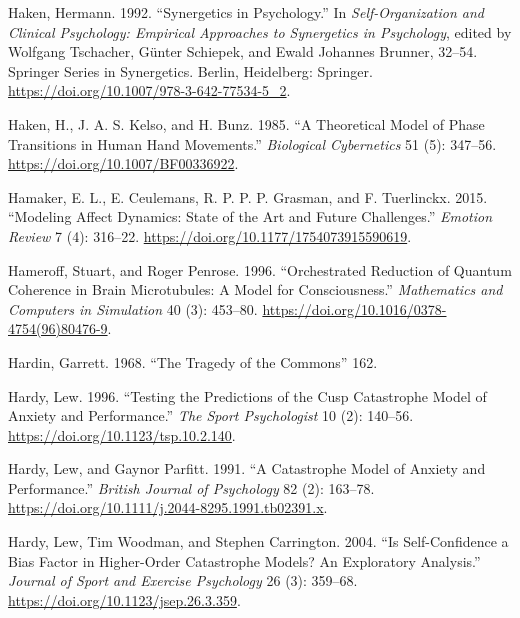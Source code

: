 \documentclass[
  a4paper,
  DIV=11,
  numbers=noendperiod]{scrreprt}
\newlength{\cslhangindent}
\newlength{\cslentryspacingunit} %
\newenvironment{CSLReferences}[2] %
 {%
  \setlength{\parindent}{0pt}
  \ifodd #1
  \let\oldpar\par
  \def\par{\hangindent=\cslhangindent\oldpar}
  \fi
  \setlength{\parskip}{#2\cslentryspacingunit}
 }%
 {}
\begin{document}
\begin{CSLReferences}{1}{0}
\leavevmode{}%
Haken, Hermann. 1992. {``Synergetics in {Psychology}.''} In
\emph{Self-{Organization} and {Clinical Psychology}: {Empirical
Approaches} to {Synergetics} in {Psychology}}, edited by Wolfgang
Tschacher, Günter Schiepek, and Ewald Johannes Brunner, 32--54. Springer
{Series} in {Synergetics}. {Berlin, Heidelberg}: {Springer}.
\url{https://doi.org/10.1007/978-3-642-77534-5_2}.

\leavevmode{}%
Haken, H., J. A. S. Kelso, and H. Bunz. 1985. {``A Theoretical Model of
Phase Transitions in Human Hand Movements.''} \emph{Biological
Cybernetics} 51 (5): 347--56. \url{https://doi.org/10.1007/BF00336922}.

\leavevmode{}%
Hamaker, E. L., E. Ceulemans, R. P. P. P. Grasman, and F. Tuerlinckx.
2015. {``Modeling {Affect Dynamics}: {State} of the {Art} and {Future
Challenges}.''} \emph{Emotion Review} 7 (4): 316--22.
\url{https://doi.org/10.1177/1754073915590619}.

\leavevmode{}%
Hameroff, Stuart, and Roger Penrose. 1996. {``Orchestrated Reduction of
Quantum Coherence in Brain Microtubules: {A} Model for Consciousness.''}
\emph{Mathematics and Computers in Simulation} 40 (3): 453--80.
\url{https://doi.org/10.1016/0378-4754(96)80476-9}.

\leavevmode{}%
Hardin, Garrett. 1968. {``The {Tragedy} of the {Commons}''} 162.

\leavevmode{}%
Hardy, Lew. 1996. {``Testing the {Predictions} of the {Cusp Catastrophe
Model} of {Anxiety} and {Performance}.''} \emph{The Sport Psychologist}
10 (2): 140--56. \url{https://doi.org/10.1123/tsp.10.2.140}.

\leavevmode{}%
Hardy, Lew, and Gaynor Parfitt. 1991. {``A Catastrophe Model of Anxiety
and Performance.''} \emph{British Journal of Psychology} 82 (2):
163--78. \url{https://doi.org/10.1111/j.2044-8295.1991.tb02391.x}.

\leavevmode{}%
Hardy, Lew, Tim Woodman, and Stephen Carrington. 2004. {``Is
Self-Confidence a Bias Factor in Higher-Order Catastrophe Models? An
Exploratory Analysis.''} \emph{Journal of Sport and Exercise Psychology}
26 (3): 359--68. \url{https://doi.org/10.1123/jsep.26.3.359}.


\end{CSLReferences}
\end{document}
